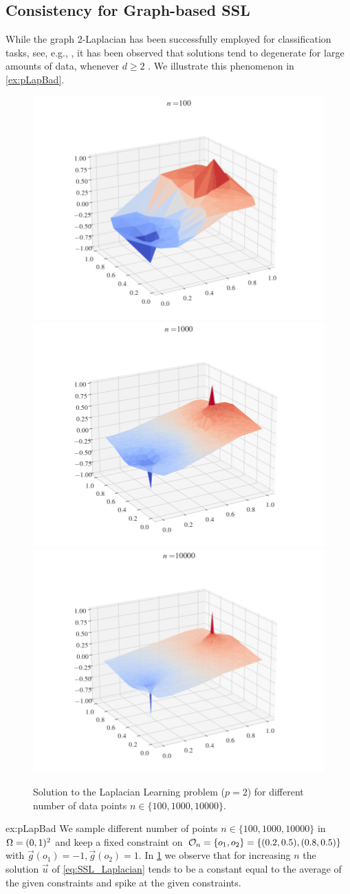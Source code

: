 \subsection{Consistency for Graph-based SSL}\label{sec:CSSL}
%
%
While the graph 2-Laplacian has been successfully employed for classification tasks, see, e.g., \cite{zhu2003semi, zhou2005regularization}, it has been observed that solutions tend to degenerate for large amounts of data, whenever $d\geq 2$ \cite{nadler2009statistical, alamgir2011phase, el2016asymptotic}. We illustrate this phenomenon in \cref{ex:pLapBad}.
%
\begin{figure}
\includegraphics[width=.28\textwidth, trim={3.1cm 1cm 3.5cm 0cm},clip]{code/SSL/2Dex_100.png}%
\hfill%
\includegraphics[width=.28\textwidth,trim={3.1cm 1cm 3.5cm 0cm},clip]{code/SSL/2Dex_1000.png}%
\hfill%
\includegraphics[width=.28\textwidth,trim={3.1cm 1cm 3.5cm 0cm},clip]{code/SSL/2Dex_10000.png}%
%
\caption[Solution to the Laplacian Learning problem for different number of data points.]{Solution to the Laplacian Learning problem ($p=2$) for different number of data points $n\in\{100,1000,10000\}$.}\label{fig:pdeg}
\end{figure}
%
%
\begin{example}{}{ex:pLapBad}
We sample different number of points $n\in\{100,1000,10000\}$ in $\Omega=(0,1)^2$ and keep a fixed constraint on $\mathcal{O}_n=\{o_1, o_2\}=\{(0.2,0.5), (0.8, 0.5)\}$ with $\vec g(o_1) = -1, \vec g(o_2)=1$. In \cref{fig:pdeg} we observe that for increasing $n$ the solution $\vec u$ of \cref{eq:SSL_Laplacian} tends to be a constant equal to the average of the given constraints and spike at the given constraints.
\end{example}
